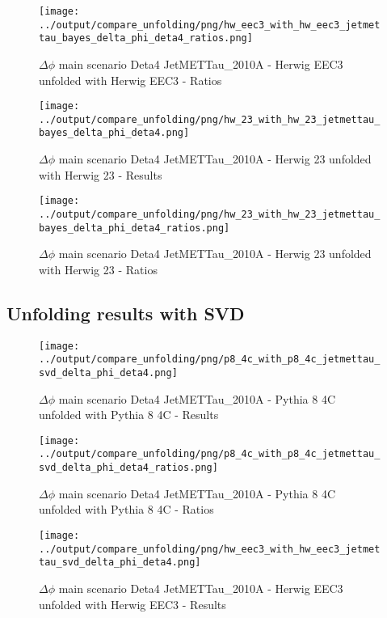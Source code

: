 \documentclass[11pt]{book}
\begin{document}
\begin{figure}[ht]
\centering
\texttt{[image: ../output/compare\_unfolding/png/hw\_eec3\_with\_hw\_eec3\_jetmettau\_bayes\_delta\_phi\_deta4\_ratios.png]}
\caption{$\Delta\phi$ main scenario Deta4 JetMETTau\_2010A - Herwig EEC3 unfolded with Herwig EEC3 - Ratios}
\label{hw_eec3_hw_eec3_jetmettau_bayes_delta_phi_deta4_b}
\end{figure}

\begin{figure}[ht]
\centering
\texttt{[image: ../output/compare\_unfolding/png/hw\_23\_with\_hw\_23\_jetmettau\_bayes\_delta\_phi\_deta4.png]}
\caption{$\Delta\phi$ main scenario Deta4 JetMETTau\_2010A - Herwig 23 unfolded with Herwig 23 - Results}
\label{hw_23_hw_23_jetmettau_bayes_delta_phi_deta4_a}
\end{figure}

\begin{figure}[ht]
\centering
\texttt{[image: ../output/compare\_unfolding/png/hw\_23\_with\_hw\_23\_jetmettau\_bayes\_delta\_phi\_deta4\_ratios.png]}
\caption{$\Delta\phi$ main scenario Deta4 JetMETTau\_2010A - Herwig 23 unfolded with Herwig 23 - Ratios}
\label{hw_23_hw_23_jetmettau_bayes_delta_phi_deta4_b}
\end{figure}

\clearpage
\subsection{Unfolding results with SVD}

\begin{figure}[ht]
\centering
\texttt{[image: ../output/compare\_unfolding/png/p8\_4c\_with\_p8\_4c\_jetmettau\_svd\_delta\_phi\_deta4.png]}
\caption{$\Delta\phi$ main scenario Deta4 JetMETTau\_2010A - Pythia 8 4C unfolded with Pythia 8 4C - Results}
\label{p8_p8_jetmettau_svd_delta_phi_deta4_a}
\end{figure}

\begin{figure}[ht]
\centering
\texttt{[image: ../output/compare\_unfolding/png/p8\_4c\_with\_p8\_4c\_jetmettau\_svd\_delta\_phi\_deta4\_ratios.png]}
\caption{$\Delta\phi$ main scenario Deta4 JetMETTau\_2010A - Pythia 8 4C unfolded with Pythia 8 4C - Ratios}
\label{p8_p8_jetmettau_svd_delta_phi_deta4_b}
\end{figure}

\begin{figure}[ht]
\centering
\texttt{[image: ../output/compare\_unfolding/png/hw\_eec3\_with\_hw\_eec3\_jetmettau\_svd\_delta\_phi\_deta4.png]}
\caption{$\Delta\phi$ main scenario Deta4 JetMETTau\_2010A - Herwig EEC3 unfolded with Herwig EEC3 - Results}
\label{hw_eec3_hw_eec3_jetmettau_svd_delta_phi_deta4_a}
\end{figure}
\end{document}
